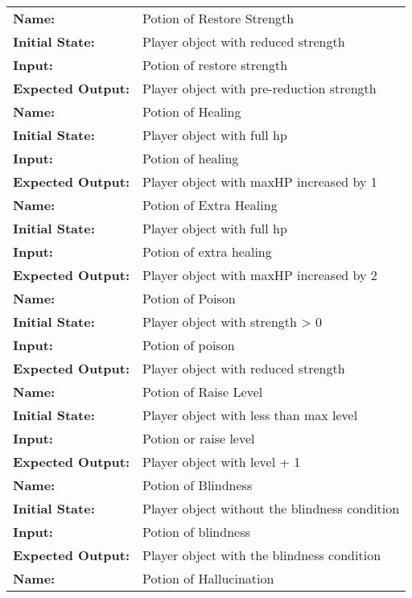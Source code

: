 \documentclass[12pt, titlepage]{article}
\begin{document}
\begin{center}
\begin{longtable}{ l | p{10cm} }
				\hline
				\rule{0pt}{1.5em}\textbf{Name:} & Potion of Restore Strength\\
				\textbf{Initial State:} & Player object with reduced strength\\
				\textbf{Input:} & Potion of restore strength\\
				\textbf{Expected Output:} & Player object with pre-reduction strength\\[0.6em]
				\hline
				\rule{0pt}{1.5em}\textbf{Name:} & Potion of Healing\\
				\textbf{Initial State:} & Player object with full hp\\
				\textbf{Input:} & Potion of healing\\
				\textbf{Expected Output:} & Player object with maxHP increased by 1\\[0.6em]
				\hline
				\rule{0pt}{1.5em}\textbf{Name:} & Potion of Extra Healing\\
				\textbf{Initial State:} & Player object with full hp\\
				\textbf{Input:} & Potion of extra healing\\
				\textbf{Expected Output:} & Player object with maxHP increased by 2\\[0.6em]
				\hline
				\rule{0pt}{1.5em}\textbf{Name:} & Potion of Poison\\
				\textbf{Initial State:} & Player object with strength > 0\\
				\textbf{Input:} & Potion of poison\\
				\textbf{Expected Output:} & Player object with reduced strength\\[0.6em]
				\hline
				\rule{0pt}{1.5em}\textbf{Name:} & Potion of Raise Level\\
				\textbf{Initial State:} & Player object with less than max level\\
				\textbf{Input:} & Potion or raise level\\
				\textbf{Expected Output:} & Player object with level + 1\\[0.6em]
				\hline
				\rule{0pt}{1.5em}\textbf{Name:} & Potion of Blindness\\
				\textbf{Initial State:} & Player object without the blindness condition\\
				\textbf{Input:} & Potion of blindness\\
				\textbf{Expected Output:} & Player object with the blindness condition\\[0.6em]
				\hline
				\rule{0pt}{1.5em}\textbf{Name:} & Potion of Hallucination\\

\end{longtable}
\end{center}
\end{document}

